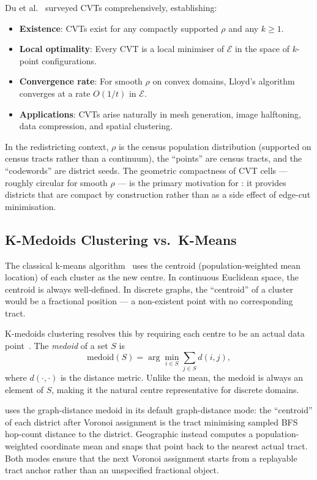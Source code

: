 Du et al.~\citeyear{du1999} surveyed CVTs comprehensively, establishing:
\begin{itemize}
\item \textbf{Existence}: CVTs exist for any compactly supported $\rho$ and
  any $k \ge 1$.
\item \textbf{Local optimality}: Every CVT is a local minimiser of
  $\mathcal{E}$ in the space of $k$-point configurations.
\item \textbf{Convergence rate}: For smooth $\rho$ on convex domains,
  Lloyd's algorithm converges at a rate $O(1/t)$ in $\mathcal{E}$.
\item \textbf{Applications}: CVTs arise naturally in mesh generation,
  image halftoning, data compression, and spatial clustering.
\end{itemize}

In the redistricting context, $\rho$ is the census population distribution
(supported on census tracts rather than a continuum), the ``points'' are
census tracts, and the ``codewords'' are district seeds.
The geometric compactness of CVT cells --- roughly circular for smooth $\rho$
--- is the primary motivation for \cvd{}: it provides districts that are
compact by construction rather than as a side effect of edge-cut minimisation.

\subsection{K-Medoids Clustering vs.\ K-Means}

The classical k-means algorithm~\citep{lloyd1982} uses the centroid
(population-weighted mean location) of each cluster as the new centre.
In continuous Euclidean space, the centroid is always well-defined.
In discrete graphs, the ``centroid'' of a cluster would be a fractional
position --- a non-existent point with no corresponding tract.

K-medoids clustering resolves this by requiring each centre to be an actual
data point~\citep{park2009}.
The \emph{medoid} of a set $S$ is
\[
  \mathrm{medoid}(S) = \arg\min_{i \in S} \sum_{j \in S} d(i,j),
\]
where $d(\cdot,\cdot)$ is the distance metric.
Unlike the mean, the medoid is always an element of $S$, making it the
natural centre representative for discrete domains.

\cvd{} uses the graph-distance medoid in its default graph-distance mode:
the ``centroid'' of each district after Voronoi assignment is the tract
minimising sampled BFS hop-count distance to the district.
Geographic \cvd{} instead computes a population-weighted coordinate mean and
snaps that point back to the nearest actual tract.
Both modes ensure that the next Voronoi assignment starts from a replayable
tract anchor rather than an unspecified fractional object.

